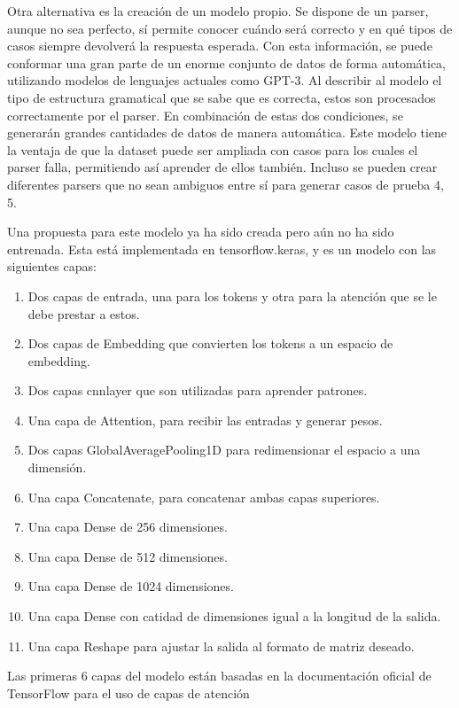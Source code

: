 Otra alternativa es la creación de un modelo propio. Se dispone de un parser, aunque no sea perfecto, sí permite conocer cuándo será correcto y en qué tipos de casos siempre devolverá la respuesta esperada. Con esta información, se puede conformar una gran parte de un enorme conjunto de datos de forma automática, utilizando modelos de lenguajes actuales como GPT-3. Al describir al modelo el tipo de estructura gramatical que se sabe que es correcta, estos son procesados correctamente por el parser. En combinación de estas dos condiciones, se generarán grandes cantidades de datos de manera automática. Este modelo tiene la ventaja de que la dataset puede ser ampliada con casos para los cuales el parser falla, permitiendo así aprender de ellos también. Incluso se pueden crear diferentes parsers que no sean ambiguos entre sí para generar casos de prueba 4, 5.

Una propuesta para este modelo ya ha sido creada pero aún no ha sido entrenada. Esta está implementada en tensorflow.keras, y es un modelo con las siguientes capas:

\begin{enumerate}
    \item Dos capas de entrada, una para los tokens y otra para la atención que se le debe prestar a estos.
    \item Dos capas de Embedding que convierten los tokens a un espacio de embedding.
    \item Dos capas cnnlayer que son utilizadas para aprender patrones.
    \item Una capa de Attention, para recibir las entradas y generar pesos.
    \item Dos capas GlobalAveragePooling1D para redimensionar el espacio a una dimensión.
    \item Una capa Concatenate, para concatenar ambas capas superiores.
    \item Una capa Dense de 256 dimensiones.
    \item Una capa Dense de 512 dimensiones.
    \item Una capa Dense de 1024 dimensiones.
    \item Una capa Dense con catidad de dimensiones igual a la longitud de la salida.
    \item Una capa Reshape para ajustar la salida al formato de matriz deseado.
\end{enumerate}
Las primeras 6 capas del modelo están basadas en la documentación oficial de TensorFlow para el uso de capas de atención

